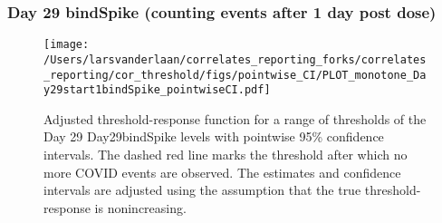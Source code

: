 \documentclass[]{article}
\begin{document}
\clearpage
\clearpage

\clearpage

\hypertarget{day-29-bindspike-counting-events-after-1-day-post-dose-1}{%
\subsubsection{Day 29 bindSpike (counting events after 1 day post
dose)}\label{day-29-bindspike-counting-events-after-1-day-post-dose-1}}

\begin{figure}[H]
\centering
\texttt{[image: /Users/larsvanderlaan/correlates\_reporting\_forks/correlates\_reporting/cor\_threshold/figs/pointwise\_CI/PLOT\_monotone\_Day29start1bindSpike\_pointwiseCI.pdf]}
\caption{Adjusted threshold-response function for a range of thresholds of the
  Day 29 Day29bindSpike levels with pointwise 95\% confidence intervals. The dashed red line marks the threshold after which no more COVID events are observed. The estimates and confidence intervals are adjusted using the assumption that the true threshold-response is nonincreasing.}
\end{figure}
\end{document}
